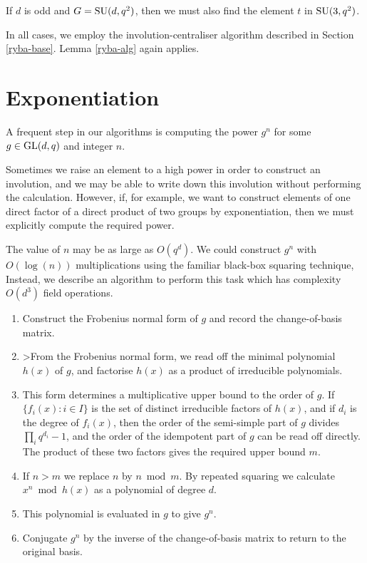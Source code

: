 \documentclass[12pt]{article}
\def\GL{{\rm GL}}
\def\SU{{\rm SU}}
\begin{document}
If $d$ is odd and $G = \SU(d, q^2)$, 
then we must also find the element
$t$ in $\SU(3, q^2)$. 

In all cases, we employ the involution-centraliser algorithm described 
in Section \ref{ryba-base}. Lemma \ref{ryba-alg} again applies.

\section{Exponentiation}
\label{Exp}

A frequent step in our algorithms is computing the 
power $g^n$ for some $g\in \GL(d,q)$ and integer $n$.

Sometimes we raise an element to a high power in order to construct an
involution, and we may be able to write down
this involution without performing the calculation. However, if, for example, 
we want to construct elements of one direct factor of a direct product 
of two groups by exponentiation, then we must explicitly
compute the required power. 

The value of $n$ may be as large as $O(q^d)$. We
could construct $g^n$ with $O(\log(n))$ multiplications using the familiar
black-box squaring technique, 
Instead, we describe an algorithm to perform this task which
has complexity $O(d^3)$ field operations.
\begin{enumerate}
\item 
Construct the Frobenius normal form of $g$ and record
the change-of-basis matrix. 

\item 
>From the Frobenius normal form, 
we read off the minimal polynomial
$h(x)$ of $g$, and factorise $h(x)$ 
as a product of irreducible polynomials.

\item 
This form determines a multiplicative upper bound
to the order of $g$. 
If $\{f_i(x):i\in I\}$ is the set of distinct
irreducible factors of $h(x)$, and if $d_i$ is the degree of
$f_i(x)$, then the order of the semi-simple part of $g$ divides
$\prod_iq^{d_i}-1$, and the order of the idempotent part of $g$ can be
read off directly. The product of these two factors  gives the
required upper bound $m$. 

\item If $n>m$ we replace $n$ by $n\bmod m$. 
By repeated squaring we calculate $x^n\bmod h(x)$ 
as a polynomial of degree $d$. 

\item This polynomial is evaluated in $g$ to give $g^n$. 

\item Conjugate $g^n$ by the inverse of the change-of-basis 
matrix to return to the original basis.
\end{enumerate}
\end{document}
